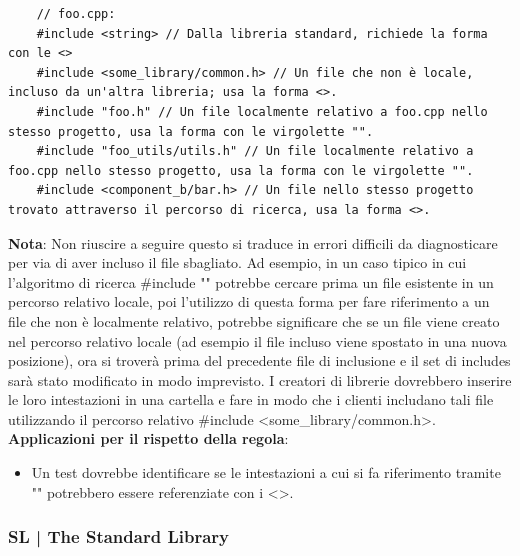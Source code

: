 \begin{lstlisting}
	// foo.cpp:
	#include <string> // Dalla libreria standard, richiede la forma con le <>
	#include <some_library/common.h> // Un file che non è locale, incluso da un'altra libreria; usa la forma <>.
	#include "foo.h" // Un file localmente relativo a foo.cpp nello stesso progetto, usa la forma con le virgolette "".
	#include "foo_utils/utils.h" // Un file localmente relativo a foo.cpp nello stesso progetto, usa la forma con le virgolette "".
	#include <component_b/bar.h> // Un file nello stesso progetto trovato attraverso il percorso di ricerca, usa la forma <>.
\end{lstlisting}

\textsf{\small \textbf{Nota}: Non riuscire a seguire questo si traduce in errori difficili da diagnosticare per via di aver incluso il file sbagliato. Ad esempio, in un caso tipico in cui l'algoritmo di ricerca \#include "" potrebbe cercare prima un file esistente in un percorso relativo locale, poi l'utilizzo di questa forma per fare riferimento a un file che non è localmente relativo, potrebbe significare che se un file viene creato nel percorso relativo locale (ad esempio il file incluso viene spostato in una nuova posizione), ora si troverà prima del precedente file di inclusione e il set di includes sarà stato modificato in modo imprevisto. I creatori di librerie dovrebbero inserire le loro intestazioni in una cartella e fare in modo che i clienti includano tali file utilizzando il percorso relativo \#include <some\_library/common.h>.} \\ %

\textsf{\small \textbf{Applicazioni per il rispetto della regola}: }

\begin{itemize}
	\item \textsf{\small Un test dovrebbe identificare se le intestazioni a cui si fa riferimento tramite "" potrebbero essere referenziate con i <>.}
\end{itemize}

\break


\subsubsection{SL | The Standard Library}

